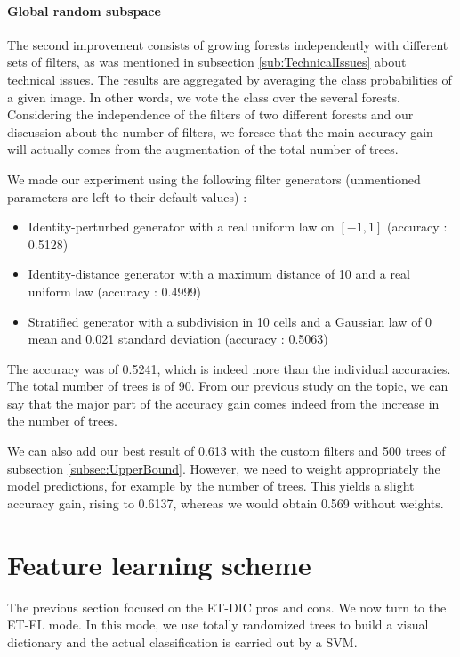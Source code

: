 \documentclass[a4paper]{report}
\begin{document}
	
	
	\paragraph{Global random subspace}
	The second improvement consists of growing forests independently with different sets of filters, as was mentioned in subsection \ref{sub:TechnicalIssues} about technical issues. The results are aggregated by averaging the class probabilities of a given image. In other words, we vote the class over the several forests.
	Considering the independence of the filters of two different forests and our discussion about the number of filters, we foresee that the main accuracy gain will actually comes from the augmentation of the total number of trees. 
	\par
	We made our experiment using the following filter generators (unmentioned parameters are left to their default values) : 
	\begin{itemize}
		\item Identity-perturbed generator with a real uniform law on $[-1, 1]$ (accuracy : 0.5128)	 %
		\item Identity-distance generator with a maximum distance of 10 and a real uniform law (accuracy : 0.4999) %
		\item Stratified generator with a subdivision in 10 cells and a Gaussian law of 0 mean and 0.021 standard deviation (accuracy : 0.5063) %
	\end{itemize}
	The accuracy was of 0.5241, which is indeed more than the individual accuracies. The total number of trees is of 90. From our previous study on the topic, we can say that the major part of the accuracy gain comes indeed from the increase in the number of trees.
	\par
	We can also add our best result of 0.613 with the custom filters and 500 trees of subsection \ref{subsec:UpperBound}. However, we need to weight appropriately the model predictions, for example by the number of trees. This yields a slight accuracy gain, rising to 0.6137, whereas we would obtain 0.569 without weights. 
	
	
	
	
	
	

	
	\section{Feature learning scheme}
	The previous section focused on the ET-DIC pros and cons. We now turn to the ET-FL mode. In this mode, we use totally randomized trees to build a visual dictionary and the actual classification is carried out by a SVM. 
\end{document}
